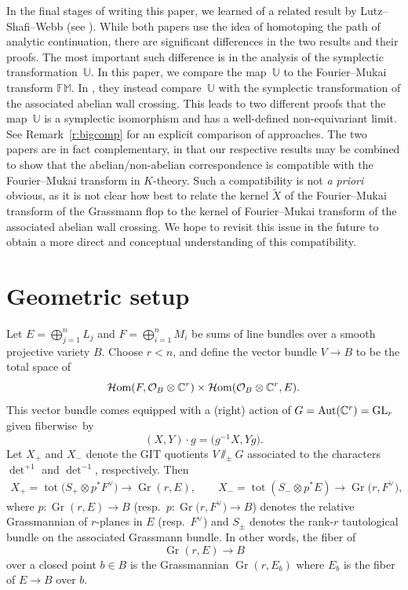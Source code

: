 \documentclass[pdftex]{sigma}
\numberwithin{equation}{section}
\newcommand{\cc}[1]{\mathcal{#1}} %
\newcommand{\CC}{\mathbb{C}}
\newcommand{\UU}{\mathbb{U}}
\newcommand{\FM}{\mathbb{FM}}
\DeclareMathOperator{\tot}{tot}
\DeclareMathOperator{\Gr}{Gr}
\newcommand{\op}[1]{\operatorname{#1}}
\newcommand{\F}{F}
\newcommand{\E}{E}
\newcommand{\MB}{M}
\newcommand{\LB}{L}
\begin{document}
In the final stages of writing this paper, we learned of a related result by Lutz--Shafi--Webb (see \cite{LSW}).
While both papers use the idea of homotoping the path of analytic continuation, there are significant differences in the two results and their proofs.
The most important such difference is in the analysis of the symplectic transformation~$\UU$. In this paper, we compare the map~$\UU$ to the Fourier--Mukai transform $\FM$. In \cite{LSW}, they instead compare~$\UU$ with the symplectic transformation of the associated abelian wall crossing. This leads to two different proofs that the map~$\UU$ is a symplectic isomorphism and has a well-defined non-equivariant limit. See Remark~\ref{r:bigcomp} for an explicit comparison of approaches.
The two papers are in fact complementary, in that our respective results may be combined to show that the abelian/non-abelian correspondence is compatible with the Fourier--Mukai transform in $K$-theory. Such a compatibility is not \textit{a priori} obvious, as it is not clear how best to relate the kernel $\tilde X$ of the Fourier--Mukai transform of the Grassmann flop to the kernel of Fourier--Mukai transform of the associated abelian wall crossing.
We hope to revisit this issue in the future to obtain a more direct and conceptual understanding of this compatibility.

\section{Geometric setup}\label{gs}
Let $\E = \bigoplus_{j=1}^n \LB_j$ and $\F = \bigoplus_{i=1}^n \MB_i$ be sums of line bundles over a smooth projective variety $B$. Choose $r < n$, and define the vector bundle $V \to B$ to be the total space of
\[
\mathcal{H}{\rm om}(\F, \cc O_B \otimes \CC^r) \times \mathcal{H}{\rm om}(\cc O_B \otimes \CC^r, \E).
\]
This vector bundle comes equipped with a (right) action of $G = \op{Aut}(\CC^r) = {\rm GL}_r$ given fiberwise~by
\[
(X, Y)\cdot g = \bigl( g^{-1}X, Yg\bigr).
\]
Let $X_+$ and $X_-$ denote the GIT quotients $V\sslash_\pm G$ associated to the characters $\det^{+1}$ and $\det^{-1}$, respectively. Then
\begin{align*}
X_+ = \tot\bigl(S_+ \otimes p^*\F^\vee\bigr) \to \Gr(r, \E) ,\qquad
X_- =\tot(S_- \otimes p^*\E) \to \Gr\bigl(r, \F^\vee\bigr),
\end{align*}
where $p\colon \Gr(r, \E) \to B $ \big(resp.\ $p\colon \Gr\bigl(r, \F^\vee\bigr) \to B$\big) denotes the relative Grassmannian of $r$-planes in $\E$ \big(resp.\ $\F^\vee$\big) and $S_\pm$ denotes the rank-$r$ tautological bundle on the associated Grassmann bundle. In other words, the fiber of
\[
\Gr(r, \E) \to B
\]
over a closed point $b \in B$ is the Grassmannian $\Gr(r, \E_b)$ where $\E_b$ is the fiber of $\E \to B$ over $b$.
\end{document}

